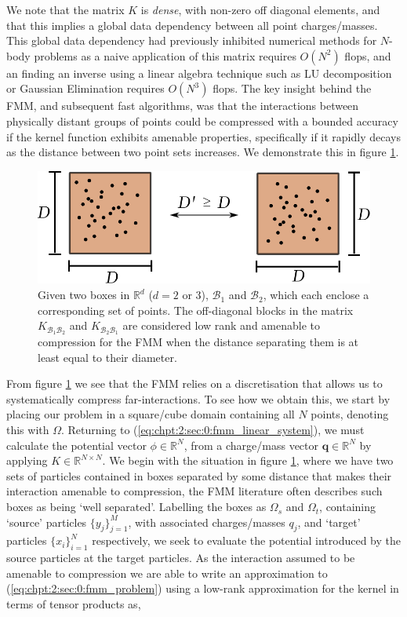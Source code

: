 We note that the matrix $K$ is \textit{dense}, with non-zero off diagonal elements, and that this implies a global data dependency between all point charges/masses. This global data dependency had previously inhibited numerical methods for $N$-body problems as a naive application of this matrix requires $O(N^2)$ flops, and an finding an inverse using a linear algebra technique such as LU decomposition or Gaussian Elimination requires $O(N^3)$ flops. The key insight behind the FMM, and subsequent fast algorithms, was that the interactions between physically distant groups of points could be compressed with a bounded accuracy if the kernel function exhibits amenable properties, specifically if it rapidly decays as the distance between two point sets increases. We demonstrate this in figure \ref{fig:chpt:2:sec:0:rank_decay}.

\begin{figure}[h]
    \centering
    \includegraphics[width=0.7\linewidth]{images/ch_2/low_rank.pdf}
    \caption{Given two boxes in $\mathbb{R}^d$ ($d=2$ or 3), $\mathcal{B}_1$ and $\mathcal{B}_2$, which each enclose a corresponding set of points. The off-diagonal blocks in the matrix $K_{\mathcal{B}_1\mathcal{B}_2}$ and $K_{\mathcal{B}_2\mathcal{B}_1}$ are considered low rank and amenable to compression for the FMM when the distance separating them is at least equal to their diameter.}
    \label{fig:chpt:2:sec:0:rank_decay}
\end{figure}

From figure \ref{fig:chpt:2:sec:0:rank_decay} we see that the FMM relies on a discretisation that allows us to systematically compress far-interactions. To see how we obtain this, we start by placing our problem in a square/cube domain containing all $N$ points, denoting this with $\Omega$. Returning to (\ref{eq:chpt:2:sec:0:fmm_linear_system}), we must calculate the potential vector $\phi \in \mathbb{R}^N$, from a charge/mass vector $\mathbf{q} \in \mathbb{R}^N$ by applying $K \in \mathbb{R}^{N \times N} $. We begin with the situation in figure \ref{fig:chpt:2:sec:0:rank_decay}, where we have two sets of particles contained in boxes separated by some distance that makes their interaction amenable to compression, the FMM literature often describes such boxes as being `well separated'. Labelling the boxes as $\Omega_s$ and $\Omega_t$, containing `source' particles $\{y_j\}_{j=1}^M$, with associated charges/masses $q_j$, and `target' particles $\{x_i\}_{i=1}^N$ respectively, we seek to evaluate the potential introduced by the source particles at the target particles. As the interaction assumed to be amenable to compression we are able to write an approximation to (\ref{eq:chpt:2:sec:0:fmm_problem}) using a low-rank approximation for the kernel in terms of tensor products as,

